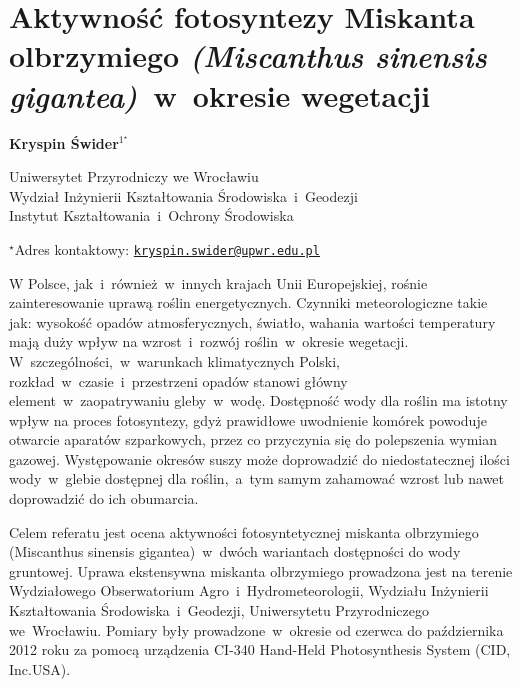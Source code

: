 \documentclass[\main/boa.tex]{subfiles}
\begin{document}
\sloppy


\section{Aktywność fotosyntezy Miskanta olbrzymiego \emph{(Miscanthus sinensis gigantea)}~w~okresie wegetacji}

\begin{center}
  {\bf {} Kryspin \'Swider$^{1^\star}$}
\end{center}

\vskip 0.3cm

\begin{affiliations}
\begin{enumerate}
\begin{minipage}{0.915\textwidth}
\centering
\item  Uniwersytet Przyrodniczy we Wrocławiu\\ Wydział Inżynierii Kształtowania Środowiska~i~Geodezji\\ Instytut Kształtowania~i~Ochrony Środowiska
\end{minipage}
\end{enumerate}
$^\star$Adres kontaktowy: \href{mailto:kryspin.swider@upwr.edu.pl}{\nolinkurl{kryspin.swider@upwr.edu.pl}}\\
\end{affiliations}

\vskip 0.5cm


\vskip 0.5cm

W Polsce, jak~i~również~w~innych krajach Unii Europejskiej, rośnie zainteresowanie uprawą roślin energetycznych. Czynniki meteorologiczne takie jak: wysokość opadów atmosferycznych, światło, wahania wartości temperatury mają duży wpływ na wzrost~i~rozwój roślin~w~okresie wegetacji. W~szczególności,~w~warunkach klimatycznych Polski, rozkład~w~czasie~i~przestrzeni opadów stanowi główny element~w~zaopatrywaniu gleby~w~wodę. Dostępność wody dla roślin ma istotny wpływ na proces fotosyntezy, gdyż prawidłowe uwodnienie komórek powoduje otwarcie aparatów szparkowych, przez co przyczynia się do polepszenia wymian gazowej. Występowanie okresów suszy może doprowadzić do niedostatecznej ilości wody~w~glebie dostępnej dla roślin,~a~tym samym zahamować wzrost lub nawet doprowadzić do ich obumarcia.

Celem referatu jest ocena aktywności fotosyntetycznej miskanta olbrzymiego (Miscanthus sinensis gigantea)~w~dwóch wariantach dostępności do wody gruntowej. Uprawa ekstensywna miskanta olbrzymiego prowadzona jest na terenie Wydziałowego Obserwatorium Agro~i~Hydrometeorologii, Wydziału Inżynierii Kształtowania Środowiska~i~Geodezji, Uniwersytetu Przyrodniczego we~Wrocławiu. Pomiary były prowadzone~w~okresie od czerwca do października 2012 roku za pomocą urządzenia CI-340 Hand-Held Photosynthesis System (CID, Inc.USA). 
\end{document}
